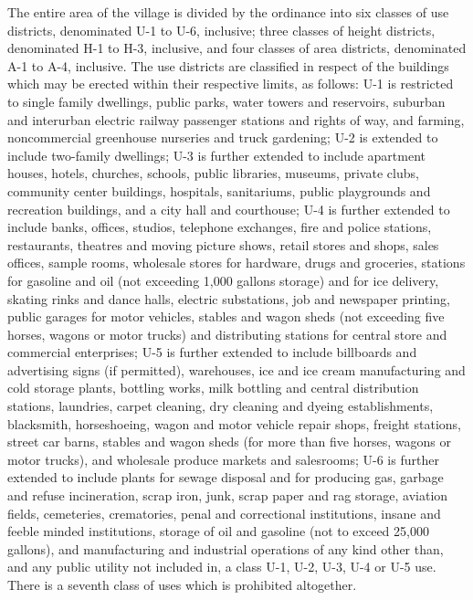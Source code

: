 The entire area of the village is divided by the ordinance into six classes of
use districts, denominated U-1 to U-6, inclusive; three classes of height
districts, denominated H-1 to H-3, inclusive, and four classes of area
districts, denominated A-1 to A-4, inclusive. The use districts are classified
in respect of the buildings which may be erected within their respective limits,
as follows: U-1 is restricted to single family dwellings, public parks, water
towers and reservoirs, suburban and interurban electric railway passenger
stations and rights of way, and farming, noncommercial greenhouse nurseries and
truck gardening; U-2 is extended to include two-family dwellings; U-3 is further
extended to include apartment houses, hotels, churches, schools, public
libraries, museums, private clubs, community center buildings, hospitals,
sanitariums, public playgrounds and recreation buildings, and a city hall and
courthouse; U-4 is further extended to include banks, offices, studios,
telephone exchanges, fire and police stations, restaurants, theatres and moving
picture shows, retail stores and shops, sales offices, sample rooms, wholesale
stores for hardware, drugs and groceries, stations for gasoline and oil (not
exceeding 1,000 gallons storage) and for ice delivery, skating rinks and dance
halls, electric substations, job and newspaper printing, public garages for
motor vehicles, stables and wagon sheds (not exceeding five horses, wagons or
motor trucks) and distributing stations for central store and commercial
enterprises; U-5 is further extended to include billboards and advertising signs
(if permitted), warehouses, ice and ice cream manufacturing and cold storage
plants, bottling works, milk bottling and central distribution stations,
laundries, carpet cleaning, dry cleaning and dyeing establishments, blacksmith,
horseshoeing, wagon and motor vehicle repair shops, freight stations, street car
barns, stables and wagon sheds (for more than five horses, wagons or motor
trucks), and wholesale produce markets and salesrooms; U-6 is further extended
to include plants for sewage disposal and for producing gas, garbage and refuse
incineration, scrap iron, junk, scrap paper and rag storage, aviation fields,
cemeteries, crematories, penal and correctional institutions, insane and feeble
minded institutions, storage of oil and gasoline (not to exceed 25,000 gallons),
and manufacturing and industrial operations of any kind other than, and any
public utility not included in, a class U-1, U-2, U-3, U-4 or U-5 use. There is
a seventh class of uses which is prohibited altogether.

